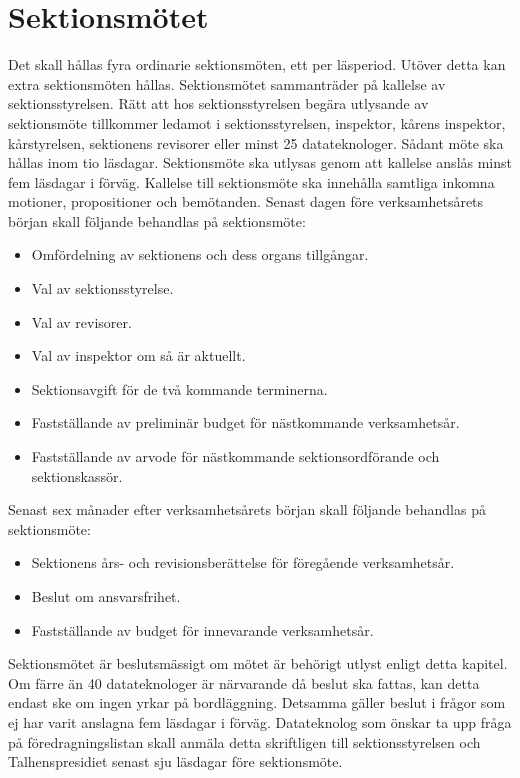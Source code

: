 \documentclass[a4paper]{dtek}
\begin{document}
\section{Sektionsmötet}
\para[Sammanträden] Det skall hållas fyra ordinarie sektionsmöten, ett per läsperiod. Utöver detta kan extra sektionsmöten hållas.
\para Sektionsmötet sammanträder på kallelse av sektionsstyrelsen.
\para Rätt att hos sektionsstyrelsen begära utlysande av sektionsmöte tillkommer ledamot i sektionsstyrelsen, inspektor, kårens inspektor, kårstyrelsen, sektionens revisorer eller minst 25 datateknologer. Sådant möte ska hållas inom tio läsdagar.
\para Sektionsmöte ska utlysas genom att kallelse anslås minst fem läsdagar i förväg.
\para Kallelse till sektionsmöte ska innehålla samtliga inkomna motioner, propositioner och bemötanden.
\para[Åligganden] Senast dagen före verksamhetsårets början skall följande behandlas på sektionsmöte:
\begin{itemize}
\item Omfördelning av sektionens och dess organs tillgångar.
\item Val av sektionsstyrelse.
\item Val av revisorer.
\item Val av inspektor om så är aktuellt.
\item Sektionsavgift för de två kommande terminerna.
\item Fastställande av preliminär budget för nästkommande verksamhetsår.
\item Fastställande av arvode för nästkommande sektionsordförande och sektionskassör.
\end{itemize}
\para Senast sex månader efter verksamhetsårets början skall följande behandlas på sektionsmöte:
\begin{itemize}
\item Sektionens års- och revisionsberättelse för föregående verksamhetsår.
\item Beslut om ansvarsfrihet.
\item Fastställande av budget för innevarande verksamhetsår.
\end{itemize}
\para[Beslutförhet] Sektionsmötet är beslutsmässigt om mötet är behörigt utlyst enligt detta kapitel.
\stycke
Om färre än 40 datateknologer är närvarande då beslut ska fattas, kan detta endast ske om ingen yrkar på bordläggning.
\stycke Detsamma gäller beslut i frågor som ej har varit anslagna fem läsdagar i förväg.
\para[Motion] Datateknolog som önskar ta upp fråga på föredragningslistan skall anmäla detta skriftligen till sektionsstyrelsen och Talhenspresidiet senast sju läsdagar före sektionsmöte.
\end{document}
